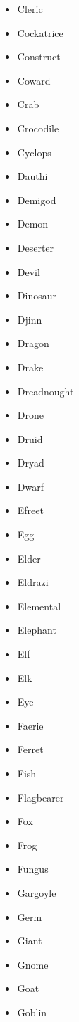 \documentclass{article}
\begin{document}
\begin{multicols}{3}
\begin{itemize}
        \item Cleric
        \item Cockatrice
        \item Construct
        \item Coward
        \item Crab
        \item Crocodile
        \item Cyclops
        \item Dauthi
        \item Demigod
        \item Demon
        \item Deserter
        \item Devil
        \item Dinosaur
        \item Djinn
        \item Dragon
        \item Drake
        \item Dreadnought
        \item Drone
        \item Druid
        \item Dryad
        \item Dwarf
        \item Efreet
        \item Egg
        \item Elder
        \item Eldrazi
        \item Elemental
        \item Elephant
        \item Elf
        \item Elk
        \item Eye
        \item Faerie
        \item Ferret
        \item Fish
        \item Flagbearer
        \item Fox
        \item Frog
        \item Fungus
        \item Gargoyle
        \item Germ
        \item Giant
        \item Gnome
        \item Goat
        \item Goblin

\end{itemize}
\end{multicols}
\end{document}
